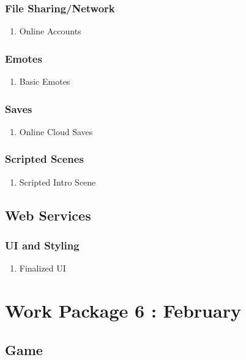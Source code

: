 \subsubsection{File Sharing/Network}
\begin{enumerate}
\item Online Accounts
\end{enumerate}
\subsubsection{Emotes}
\begin{enumerate}
\item Basic Emotes
\end{enumerate}
\subsubsection{Saves}
\begin{enumerate}
\item Online Cloud Saves
\end{enumerate}
\subsubsection{Scripted Scenes}
\begin{enumerate}
\item Scripted Intro Scene
\end{enumerate}

\subsection{Web Services}
\subsubsection{UI and Styling}
\begin{enumerate}
\item Finalized UI
\end{enumerate}



\section{Work Package 6 : February}
\subsection{Game}
